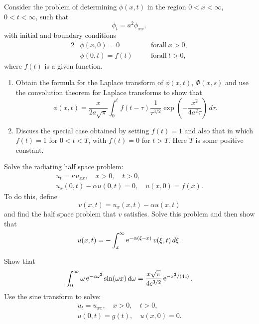 {%
\begin{Exercise}
  Consider the problem of determining $\phi(x,t)$
  in the region $ 0 < x < \infty$, $0 < t < \infty$, such that
  \begin{equation}
    \label{1:phi_t=a^2phi_xx}
    \phi_t = a^2 \phi_{xx},
  \end{equation}
  with initial and boundary conditions
  \begin{alignat*}{2}
    &\phi(x,0) = 0            &\quad &\mathrm{for all}\ x > 0, \\
    &\phi(0,t) = f(t) &\quad &\mathrm{for all}\ t > 0,
  \end{alignat*}
  where $f(t)$ is a given function. 
  \begin{enumerate}
  \item 
    Obtain the formula for the Laplace
    transform of $\phi(x,t)$, $\Phi(x,s)$ and use the convolution theorem
    for Laplace transforms to show that
    \[
    \phi(x,t) = \frac{x}{2 a \sqrt{\pi}} \int_0^t f(t - \tau) 
    \frac{1}{\tau^{3/2}} \exp \left( - \frac{x^2}{4 a^2 \tau} 
    \right) \,d\tau.
    \]
  \item
    Discuss the special case obtained by setting $f(t) = 1$ and 
    also that in which $f(t) = 1$ for $0 < t < T$, with $ f(t) = 0$ for 
    $ t > T$. Here $T$ is some positive constant.
  \end{enumerate}
\end{Exercise}





\begin{Exercise}
  Solve the radiating half space problem:
  \begin{gather*}
    u_t = \kappa u_{x x}, \quad x > 0, \quad t > 0, \\
    u_x(0,t) - \alpha u(0,t) = 0, \quad u(x,0) = f(x).
  \end{gather*}
  To do this, define 
  \[
  v(x,t) = u_x(x,t) - \alpha u(x,t)
  \]
  and find the half space problem that $v$ satisfies.  Solve this problem and
  then show that 
  \[
  u(x,t) = - \int_x^\infty \mathop{\mathrm{e}}\nolimits^{-\alpha (\xi-x)} v(\xi,t) \,d\xi.
  \]
\end{Exercise}



\begin{Exercise}
  Show that
  \[
  \int_0^\infty \omega \mathop{\mathrm{e}}\nolimits^{-c \omega^2} \sin(\omega x) \,d \omega 
  = \frac{ x \sqrt{\pi} }{ 4 c^{3/2} } \mathop{\mathrm{e}}\nolimits^{-x^2 / (4 c)}.
  \]
  Use the sine transform to solve:
  \begin{gather*}
    u_t = u_{x x}, \quad x > 0, \quad t > 0, \\
    u(0,t) = g(t), \quad u(x,0) = 0.
  \end{gather*}
\end{Exercise}


}
